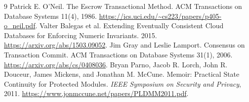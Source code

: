 \documentclass[11pt]{article}
\begin{document}
\begin{thebibliography}{9}
 Patrick E. O'Neil. The Escrow Transactional Method.
ACM Transactions on Database Systems 11(4), 1986.
\url{https://ics.uci.edu/~cs223/papers/p405-o_neil.pdf}.
 Valter Balegas et al. Extending Eventually
Consistent Cloud Databases for Enforcing Numeric Invariants.
2015. \url{https://arxiv.org/abs/1503.09052}.
 Jim Gray and Leslie Lamport. Consensus on
Transaction Commit. ACM Transactions on Database Systems 31(1),
2006. \url{https://arxiv.org/abs/cs/0408036}.
 Bryan Parno, Jacob R. Lorch, John R. Douceur,
James Mickens, and Jonathan M. McCune.
Memoir: Practical State Continuity for Protected Modules.
\emph{IEEE Symposium on Security and Privacy}, 2011.
\url{https://www.jonmccune.net/papers/PLDMM2011.pdf}.
\end{thebibliography}
\end{document}
